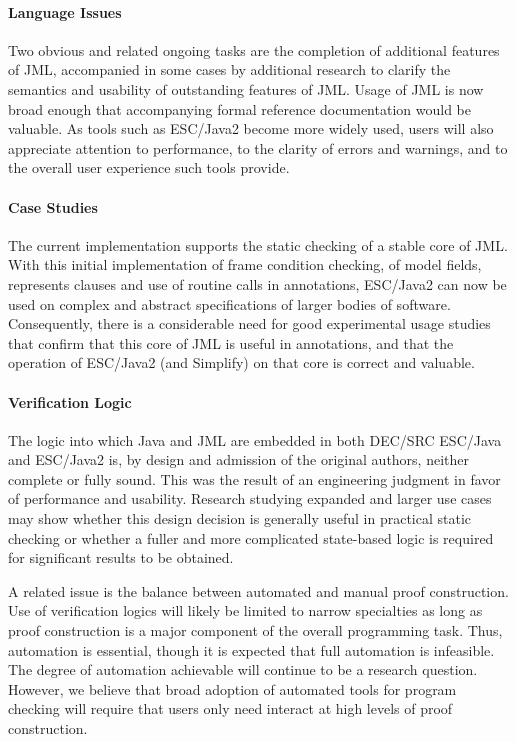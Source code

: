 \documentclass{sig-alternate}
\begin{document}
\paragraph*{Language Issues} Two obvious and related ongoing tasks are
the completion of additional features of JML, accompanied in some
cases by additional research to clarify the semantics and usability of
outstanding features of JML.  Usage of JML is now broad enough that
accompanying formal reference documentation would be valuable.  As
tools such as ESC/Java2 become more widely used, users will also
appreciate attention to performance, to the clarity of errors and
warnings, and to the overall user experience such tools provide.

\paragraph*{Case Studies} The current implementation supports the
static checking of a stable core of JML.  With this initial
implementation of frame condition checking, of model fields,
represents clauses and use of routine calls in annotations, ESC/Java2
can now be used on complex and abstract specifications of larger
bodies of software.  Consequently, there is a considerable need for
good experimental usage studies that confirm that this core of JML is
useful in annotations, and that the operation of ESC/Java2 (and
Simplify) on that core is correct and valuable.

\paragraph*{Verification Logic} The logic into which Java and JML are
embedded in both DEC/SRC ESC/Java and ESC/Java2 is, 
by design and admission of the original
authors, neither complete or fully sound.  This was the result of an
engineering judgment in favor of performance and usability.  Research
studying expanded and larger use cases may show whether this
design decision is generally useful in practical static checking or
whether a fuller and more complicated state-based logic is required
for significant results to be obtained. 

A related issue is the balance between automated and manual proof construction.
Use of verification logics will likely be limited to narrow specialties as long as proof
construction is a major component of the overall programming task.  Thus, automation
is essential, though it is expected that full automation is infeasible.  The degree of
automation achievable will continue to be a research question. 
However, we believe that broad adoption of automated tools for program checking 
will require that users only need interact at high levels of proof construction.
\end{document}
